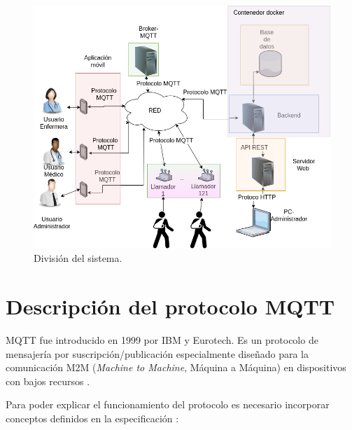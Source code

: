 \begin{figure}[ht]
	\centering
	\includegraphics[scale=.45]{./Figures/DiagramaSistemaOrganizado.png}
	\caption{División del sistema.}
	\label{fig:División del sistema}
\end{figure}

\pagebreak

\section{Descripción del protocolo MQTT}
\label{sec:Descripción del protocolo MQTT}

MQTT fue introducido en 1999 por IBM y Eurotech. Es un protocolo de mensajería por suscripción/publicación especialmente diseñado para la comunicación M2M (\textit{Machine to Machine}, Máquina a Máquina) en dispositivos con bajos recursos \citep{WEBSITE:5} .

Para poder explicar el funcionamiento del protocolo es necesario incorporar conceptos definidos en la especificación \citep{WEBSITE:5}:

